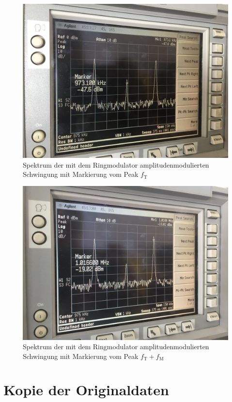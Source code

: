 \appendix


\begin{figure}[h]
  \includegraphics[width=.9\textwidth]{Spektrum_Pics/b2.jpg}
  \caption{Spektrum der mit dem Ringmodulator amplitudenmodulierten Schwingung mit Markierung vom Peak $f_\text{T}$}
  \label{fig:b2}
\end{figure}
\begin{figure}[h]
  \includegraphics[width=.9\textwidth]{Spektrum_Pics/b3.jpg}
  \caption{Spektrum der mit dem Ringmodulator amplitudenmodulierten Schwingung mit Markierung vom Peak $f_\text{T} + f_\text{M}$}
  \label{fig:b3}
\end{figure}

\section{Kopie der Originaldaten}

